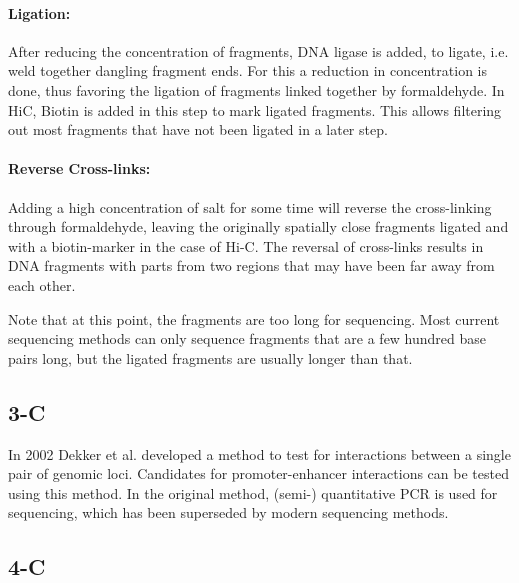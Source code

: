 \paragraph{Ligation:}\label{sec:ligation}
After reducing the concentration of fragments, DNA ligase is added, to ligate,
i.e. weld together dangling fragment ends. For this a reduction in
concentration is done, thus favoring the ligation of fragments linked
together by formaldehyde.
In HiC, Biotin is added in this step to mark ligated fragments. This allows
filtering out most fragments that have not been ligated in a later step.




\paragraph{Reverse Cross-links:}\label{sec:revcrosslink}
Adding a high concentration of salt for some time will reverse the
cross-linking through formaldehyde, leaving the originally spatially close
fragments ligated and with a biotin-marker in the case of Hi-C.
The reversal of cross-links results in DNA fragments with parts from two
regions that may have been far away from each other.

Note that at this point, the fragments are too long for sequencing. Most
current sequencing methods can only sequence fragments that are a few hundred
base pairs long, but the ligated fragments are usually longer than that.




\subsection{3-C}\label{sec:3C}

In 2002 Dekker et al. \cite{dekker2002capturing} developed a method to test for
interactions between a single pair of genomic loci. Candidates for
promoter-enhancer interactions can be tested using this method.
In the original method, (semi-) quantitative PCR is used for sequencing, which
has been superseded by modern sequencing methods.


\subsection{4-C}\label{sec:4C}


